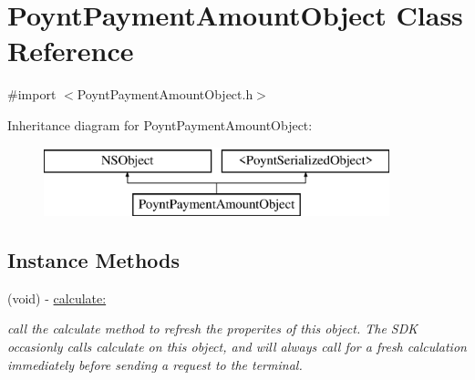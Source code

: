 \hypertarget{interface_poynt_payment_amount_object}{}\section{Poynt\+Payment\+Amount\+Object Class Reference}
\label{interface_poynt_payment_amount_object}


{\ttfamily \#import $<$Poynt\+Payment\+Amount\+Object.\+h$>$}

Inheritance diagram for Poynt\+Payment\+Amount\+Object\+:\begin{figure}[H]
\begin{center}
\leavevmode
\includegraphics[height=2.000000cm]{interface_poynt_payment_amount_object}
\end{center}
\end{figure}
\subsection*{Instance Methods}
\begin{DoxyCompactItemize}
\item 
(void) -\/ \hyperlink{interface_poynt_payment_amount_object_a1c43473c035627846e64fddfb2bbe57d}{calculate\+:}
\begin{DoxyCompactList}\small\item\em call the calculate method to refresh the properites of this object. The S\+DK occasionly calls calculate on this object, and will always call for a fresh calculation immediately before sending a request to the terminal. \end{DoxyCompactList}\end{DoxyCompactItemize}
